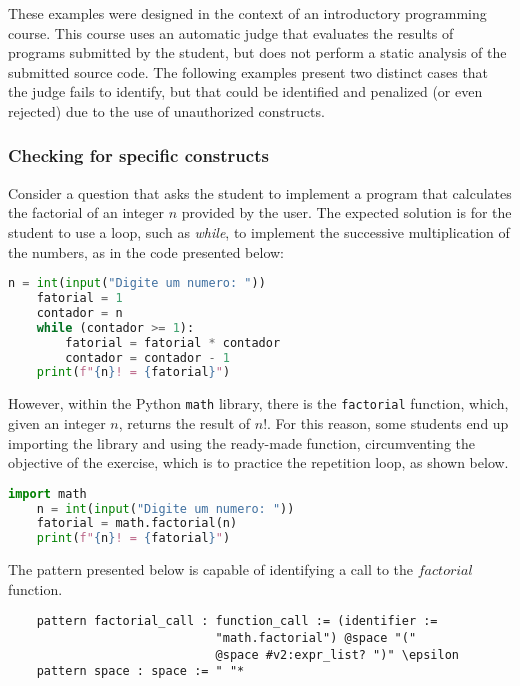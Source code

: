 These examples were designed in the context of an introductory programming course.
This course uses an automatic judge that evaluates the results of programs
submitted by the student, but does not perform a static analysis of the submitted
source code. The following examples present two distinct cases that the judge
fails to identify, but that could be identified and penalized (or even rejected) due
to the use of unauthorized constructs.

\subsubsection{Checking for specific constructs}

Consider a question that asks the student to implement a program that
calculates the factorial of an integer \(n\) provided by the user.
The expected solution is for the student to use a loop, such as \textit{while},
to implement the successive multiplication of the numbers, as in the code
presented below:

\begin{lstlisting}[language=Python]
    n = int(input("Digite um numero: "))
    fatorial = 1
    contador = n
    while (contador >= 1):
        fatorial = fatorial * contador
        contador = contador - 1
    print(f"{n}! = {fatorial}")
\end{lstlisting}

However, within the Python \texttt{math} library, there is the \texttt{factorial}
function, which, given an integer \(n\), returns the result of \(n!\).
For this reason, some students end up importing the library and using the
ready-made function, circumventing the objective of the exercise, which is
to practice the repetition loop, as shown below.

\begin{lstlisting}[language=Python]
    import math
    n = int(input("Digite um numero: "))
    fatorial = math.factorial(n)
    print(f"{n}! = {fatorial}")
\end{lstlisting}


The pattern presented below is capable of identifying a call to the 
\(factorial\) function.

\begin{verbatim}
    pattern factorial_call : function_call := (identifier :=
                             "math.factorial") @space "("
                             @space #v2:expr_list? ")" \epsilon
    pattern space : space := " "*
\end{verbatim}

